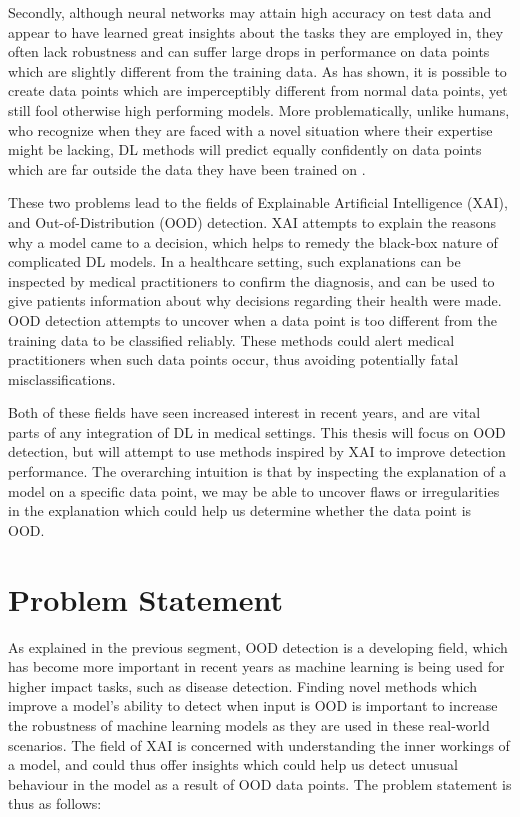 \documentclass[UKenglish]{uiomasterthesis} %
\theoremstyle{definition}
\begin{document}
Secondly, although neural networks may attain high accuracy on test data and appear to have learned great insights about the tasks they are employed in, they often lack robustness and can suffer large drops in performance on data points which are slightly different from the training data. As \cite{intriguing} has shown, it is possible to create data points which are imperceptibly different from normal data points, yet still fool otherwise high performing models. More problematically, unlike humans, who recognize when they are faced with a novel situation where their expertise might be lacking, DL methods will predict equally confidently on data points which are far outside the data they have been trained on \cite{tingsim}.

These two problems lead to the fields of Explainable Artificial Intelligence (XAI), and Out-of-Distribution (OOD) detection. XAI attempts to explain the reasons why a model came to a decision, which helps to remedy the black-box nature of complicated DL models. In a healthcare setting, such explanations can be inspected by medical practitioners to confirm the diagnosis, and can be used to give patients information about why decisions regarding their health were made. OOD detection attempts to uncover when a data point is too different from the training data to be classified reliably. These methods could alert medical practitioners when such data points occur, thus avoiding potentially fatal misclassifications.

Both of these fields have seen increased interest in recent years, and are vital parts of any integration of DL in medical settings. This thesis will focus on OOD detection, but will attempt to use methods inspired by XAI to improve detection performance. The overarching intuition is that by inspecting the explanation of a model on a specific data point, we may be able to uncover flaws or irregularities in the explanation which could help us determine whether the data point is OOD.


\section{Problem Statement} \label{section:problemstatement}

As explained in the previous segment, OOD detection is a developing field, which has become more important in recent years as machine learning is being used for higher impact tasks, such as disease detection. Finding novel methods which improve a model's ability to detect when input is OOD is important to increase the robustness of machine learning models as they are used in these real-world scenarios. The field of XAI is concerned with understanding the inner workings of a model, and could thus offer insights which could help us detect unusual behaviour in the model as a result of OOD data points. The problem statement is thus as follows:
\end{document}
